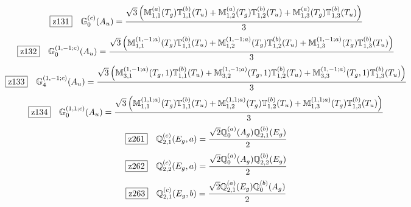 \documentclass[fleqn,10pt,landscape]{jsarticle}
\begin{document}
\begin{dmath*}
\hspace*{3mm}\fbox{z131}\quad \mathbb{G}_{0}^{(c)}(A_{u})=\frac{\sqrt{3} \left(\mathbb{M}_{1,1}^{(a)}(T_{g}) \mathbb{T}_{1,1}^{(b)}(T_{u}) + \mathbb{M}_{1,2}^{(a)}(T_{g}) \mathbb{T}_{1,2}^{(b)}(T_{u}) + \mathbb{M}_{1,3}^{(a)}(T_{g}) \mathbb{T}_{1,3}^{(b)}(T_{u})\right)}{3}
\end{dmath*}
\begin{dmath*}
\hspace*{3mm}\fbox{z132}\quad \mathbb{G}_{0}^{(1,-1;c)}(A_{u})=\frac{\sqrt{3} \left(\mathbb{M}_{1,1}^{(1,-1;a)}(T_{g}) \mathbb{T}_{1,1}^{(b)}(T_{u}) + \mathbb{M}_{1,2}^{(1,-1;a)}(T_{g}) \mathbb{T}_{1,2}^{(b)}(T_{u}) + \mathbb{M}_{1,3}^{(1,-1;a)}(T_{g}) \mathbb{T}_{1,3}^{(b)}(T_{u})\right)}{3}
\end{dmath*}
\begin{dmath*}
\hspace*{3mm}\fbox{z133}\quad \mathbb{G}_{4}^{(1,-1;c)}(A_{u})=\frac{\sqrt{3} \left(\mathbb{M}_{3,1}^{(1,-1;a)}(T_{g},1) \mathbb{T}_{1,1}^{(b)}(T_{u}) + \mathbb{M}_{3,2}^{(1,-1;a)}(T_{g},1) \mathbb{T}_{1,2}^{(b)}(T_{u}) + \mathbb{M}_{3,3}^{(1,-1;a)}(T_{g},1) \mathbb{T}_{1,3}^{(b)}(T_{u})\right)}{3}
\end{dmath*}
\begin{dmath*}
\hspace*{3mm}\fbox{z134}\quad \mathbb{G}_{0}^{(1,1;c)}(A_{u})=\frac{\sqrt{3} \left(\mathbb{M}_{1,1}^{(1,1;a)}(T_{g}) \mathbb{T}_{1,1}^{(b)}(T_{u}) + \mathbb{M}_{1,2}^{(1,1;a)}(T_{g}) \mathbb{T}_{1,2}^{(b)}(T_{u}) + \mathbb{M}_{1,3}^{(1,1;a)}(T_{g}) \mathbb{T}_{1,3}^{(b)}(T_{u})\right)}{3}
\end{dmath*}
\begin{dmath*}
\hspace*{3mm}\fbox{z261}\quad \mathbb{Q}_{2,1}^{(c)}(E_{g},a)=\frac{\sqrt{2} \mathbb{Q}_{0}^{(a)}(A_{g}) \mathbb{Q}_{2,1}^{(b)}(E_{g})}{2}
\end{dmath*}
\begin{dmath*}
\hspace*{3mm}\fbox{z262}\quad \mathbb{Q}_{2,2}^{(c)}(E_{g},a)=\frac{\sqrt{2} \mathbb{Q}_{0}^{(a)}(A_{g}) \mathbb{Q}_{2,2}^{(b)}(E_{g})}{2}
\end{dmath*}
\begin{dmath*}
\hspace*{3mm}\fbox{z263}\quad \mathbb{Q}_{2,1}^{(c)}(E_{g},b)=\frac{\sqrt{2} \mathbb{Q}_{2,1}^{(a)}(E_{g}) \mathbb{Q}_{0}^{(b)}(A_{g})}{2}
\end{dmath*}
\end{document}
